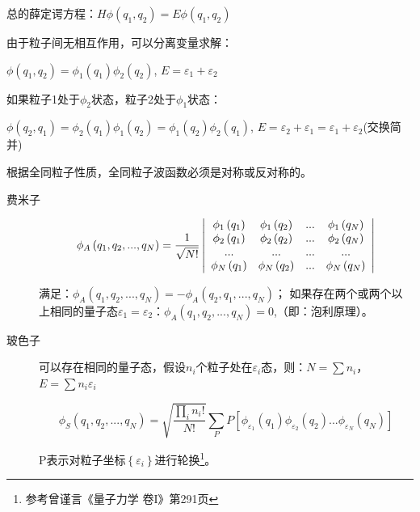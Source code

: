 总的薛定谔方程：$H\phi \left( {q_1 ,q_2 } \right) = E\phi \left(
{q_1 ,q_2 } \right)$

由于粒子间无相互作用，可以分离变量求解：

$\phi \left( {q_1 ,q_2 } \right) = \phi _1 \left( {q_1 } \right)\phi
_2 \left( {q_2 } \right)$, $E = \varepsilon _1  + \varepsilon _2 $

如果粒子1处于$\phi _2 $状态，粒子2处于$\phi _1 $状态：

$\phi \left( {q_2 ,q_1 } \right) = \phi _2 \left( {q_1 } \right)\phi
_1 \left( {q_2 } \right) = \phi _1 \left( {q_2 } \right)\phi _2
\left( {q_1 } \right)$, $E = \varepsilon _2  + \varepsilon _1  =
\varepsilon _1  + \varepsilon _2 $(交换简并)


根据全同粒子性质，全同粒子波函数必须是对称或反对称的。




\begin{description}
    \item[费米子]

\begin{equation}\label{31-8}
\phi _A \left( {q_1 ,q_2 ,...,q_N } \right) = \frac{1}{{\sqrt {N!}
}}\left| {\begin{array}{*{20}c}
   {\phi _1 \left( {q_1 } \right)} & {\phi _1 \left( {q_2 } \right)} & {...} & {\phi _1 \left( {q_N } \right)}  \\
   {\phi _2 \left( {q_1 } \right)} & {\phi _2 \left( {q_2 } \right)} & {...} & {\phi _2 \left( {q_N } \right)}  \\
   {...} & {...} & {...} & {...}  \\
   {\phi _N \left( {q_1 } \right)} & {\phi _N \left( {q_2 } \right)} & {...} & {\phi _N \left( {q_N } \right)}  \\
\end{array}} \right|
\end{equation}

满足：$\phi _A \left( {q_1 ,q_2 ,...,q_N } \right) =  - \phi _A
\left( {q_2 ,q_1 ,...,q_N } \right)$；
如果存在两个或两个以上相同的量子态$\varepsilon _1  = \varepsilon _2
$：$\phi _A \left( {q_1 ,q_2 ,...,q_N } \right) =
0$,（即：泡利原理）。


    \item[玻色子]

可以存在相同的量子态，假设$n_i$个粒子处在$\varepsilon _i $态，则：$N
= \sum {n_i } $，$E = \sum {n_i \varepsilon _i } $

\begin{equation}\label{31-9}
\phi _S \left( {q_1 ,q_2 ,...,q_N } \right) = \sqrt
{\frac{{\prod\limits_i {n_i !} }}{{N!}}} \sum\limits_P {P\left[
{\phi _{\varepsilon _1 } \left( {q_1 } \right)\phi _{\varepsilon _2
} \left( {q_2 } \right)...\phi _{\varepsilon _N } \left( {q_N }
\right)} \right]}
\end{equation}

P表示对粒子坐标$\left\{ {\varepsilon _i }
\right\}$进行轮换\footnote{参考曾谨言《量子力学 卷I》第291页}。

\end{description}


